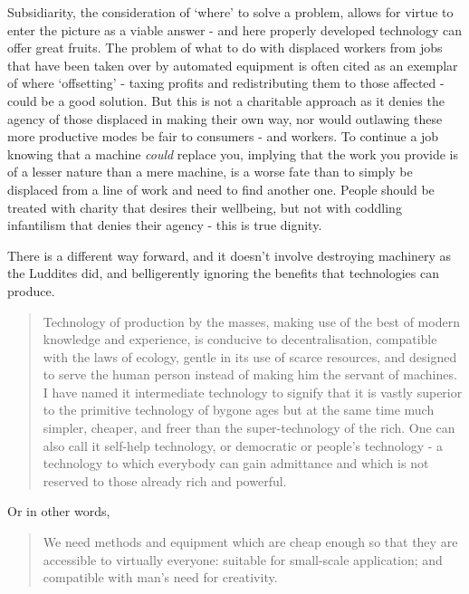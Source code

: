\documentclass[letterpaper]{article}
\begin{document}
Subsidiarity, the consideration of `where' to solve a problem, allows for virtue to enter the picture as a viable answer - and here properly developed technology can offer great fruits. The problem of what to do with displaced workers from jobs that have been taken over by automated equipment is often cited as an exemplar of where `offsetting' - taxing profits and redistributing them to those affected - could be a good solution. But this is not a charitable approach as it denies the agency of those displaced in making their own way, nor would outlawing these more productive modes be fair to consumers - and workers. To continue a job knowing that a machine \textit{could} replace you, implying that the work you provide is of a lesser nature than a mere machine, is a worse fate than to simply be displaced from a line of work and need to find another one. People should be treated with charity that desires their wellbeing, but not with coddling infantilism that denies their agency - this is true dignity.

There is a different way forward, and it doesn't involve destroying machinery as the Luddites did, and belligerently ignoring the benefits that technologies can produce.

\begin{quote}
  Technology of production by the masses, making use of the best of modern knowledge and experience, is conducive to decentralisation, compatible with the laws of ecology, gentle in its use of scarce resources, and designed to serve the human person instead of making him the servant of machines. I have named it intermediate technology to signify that it is vastly superior to the primitive technology of bygone ages but at the same time much simpler, cheaper, and freer than the super-technology of the rich. One can also call it self-help technology, or democratic or people's technology - a technology to which everybody can gain admittance and which is not reserved to those already rich and powerful.
\end{quote}

Or in other words,

\begin{quote}
  We need methods and equipment which are cheap enough so that they are accessible to virtually everyone: suitable for small-scale application; and compatible with man's need for creativity.
\end{quote}
\end{document}
